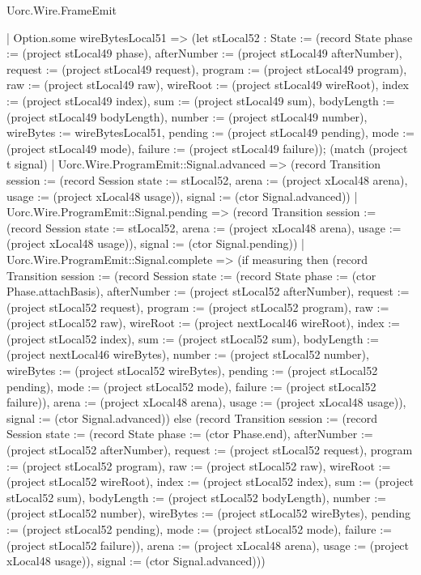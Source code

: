 \begin{lexlean}{Uorc.Wire.FrameEmit}
\begin{semanticmodule}
{      | Option.some wireBytesLocal51 => (let stLocal52 : State := (record State {phase := (project stLocal49 phase), afterNumber := (project stLocal49 afterNumber), request := (project stLocal49 request), program := (project stLocal49 program), raw := (project stLocal49 raw), wireRoot := (project stLocal49 wireRoot), index := (project stLocal49 index), sum := (project stLocal49 sum), bodyLength := (project stLocal49 bodyLength), number := (project stLocal49 number), wireBytes := wireBytesLocal51, pending := (project stLocal49 pending), mode := (project stLocal49 mode), failure := (project stLocal49 failure)}); (match (project t signal)
        | Uorc.Wire.ProgramEmit::Signal.advanced => (record Transition {session := (record Session {state := stLocal52, arena := (project xLocal48 arena), usage := (project xLocal48 usage)}), signal := (ctor Signal.advanced)})
        | Uorc.Wire.ProgramEmit::Signal.pending => (record Transition {session := (record Session {state := stLocal52, arena := (project xLocal48 arena), usage := (project xLocal48 usage)}), signal := (ctor Signal.pending)})
        | Uorc.Wire.ProgramEmit::Signal.complete => (if measuring then (record Transition {session := (record Session {state := (record State {phase := (ctor Phase.attachBasis), afterNumber := (project stLocal52 afterNumber), request := (project stLocal52 request), program := (project stLocal52 program), raw := (project stLocal52 raw), wireRoot := (project nextLocal46 wireRoot), index := (project stLocal52 index), sum := (project stLocal52 sum), bodyLength := (project nextLocal46 wireBytes), number := (project stLocal52 number), wireBytes := (project stLocal52 wireBytes), pending := (project stLocal52 pending), mode := (project stLocal52 mode), failure := (project stLocal52 failure)}), arena := (project xLocal48 arena), usage := (project xLocal48 usage)}), signal := (ctor Signal.advanced)}) else (record Transition {session := (record Session {state := (record State {phase := (ctor Phase.end), afterNumber := (project stLocal52 afterNumber), request := (project stLocal52 request), program := (project stLocal52 program), raw := (project stLocal52 raw), wireRoot := (project stLocal52 wireRoot), index := (project stLocal52 index), sum := (project stLocal52 sum), bodyLength := (project stLocal52 bodyLength), number := (project stLocal52 number), wireBytes := (project stLocal52 wireBytes), pending := (project stLocal52 pending), mode := (project stLocal52 mode), failure := (project stLocal52 failure)}), arena := (project xLocal48 arena), usage := (project xLocal48 usage)}), signal := (ctor Signal.advanced)}))
}
\end{semanticmodule}
\end{lexlean}
